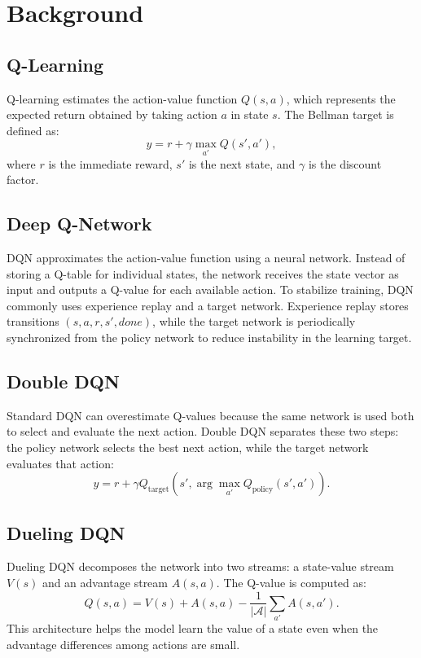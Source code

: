\documentclass[conference]{IEEEtran}
\begin{document}
\section{Background}
\subsection{Q-Learning}
Q-learning estimates the action-value function $Q(s,a)$, which represents the expected return obtained by taking action $a$ in state $s$. The Bellman target is defined as:
\begin{equation}
y = r + \gamma \max_{a'} Q(s', a'),
\end{equation}
where $r$ is the immediate reward, $s'$ is the next state, and $\gamma$ is the discount factor.

\subsection{Deep Q-Network}
DQN approximates the action-value function using a neural network. Instead of storing a Q-table for individual states, the network receives the state vector as input and outputs a Q-value for each available action. To stabilize training, DQN commonly uses experience replay and a target network. Experience replay stores transitions $(s,a,r,s',done)$, while the target network is periodically synchronized from the policy network to reduce instability in the learning target.

\subsection{Double DQN}
Standard DQN can overestimate Q-values because the same network is used both to select and evaluate the next action. Double DQN separates these two steps: the policy network selects the best next action, while the target network evaluates that action:
\begin{equation}
y = r + \gamma Q_{\text{target}}(s', \arg\max_{a'} Q_{\text{policy}}(s',a')).
\end{equation}

\subsection{Dueling DQN}
Dueling DQN decomposes the network into two streams: a state-value stream $V(s)$ and an advantage stream $A(s,a)$. The Q-value is computed as:
\begin{equation}
Q(s,a) = V(s) + A(s,a) - \frac{1}{|\mathcal{A}|}\sum_{a'} A(s,a').
\end{equation}
This architecture helps the model learn the value of a state even when the advantage differences among actions are small.
\end{document}
